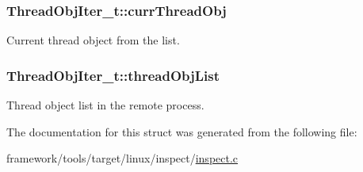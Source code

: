 \subsubsection[{\texorpdfstring{curr\+Thread\+Obj}{currThreadObj}}]{ Thread\+Obj\+Iter\+\_\+t\+::curr\+Thread\+Obj}\hypertarget{struct_thread_obj_iter__t_a68792c586dc3308949726095f6c50ddb}{}\label{struct_thread_obj_iter__t_a68792c586dc3308949726095f6c50ddb}


Current thread object from the list. 

\subsubsection[{\texorpdfstring{thread\+Obj\+List}{threadObjList}}]{ Thread\+Obj\+Iter\+\_\+t\+::thread\+Obj\+List}\hypertarget{struct_thread_obj_iter__t_a507feff4664a9220fa632f0220d2bf05}{}\label{struct_thread_obj_iter__t_a507feff4664a9220fa632f0220d2bf05}


Thread object list in the remote process. 



The documentation for this struct was generated from the following file\+:\begin{DoxyCompactItemize}
\item 
framework/tools/target/linux/inspect/\hyperlink{inspect_8c}{inspect.\+c}\end{DoxyCompactItemize}
